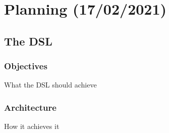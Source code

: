 \chapter{Planning (17/02/2021)}\label{cha:planning}

\section{The DSL}
\subsection{Objectives}
What the DSL should achieve
\subsection{Architecture}
How it achieves it